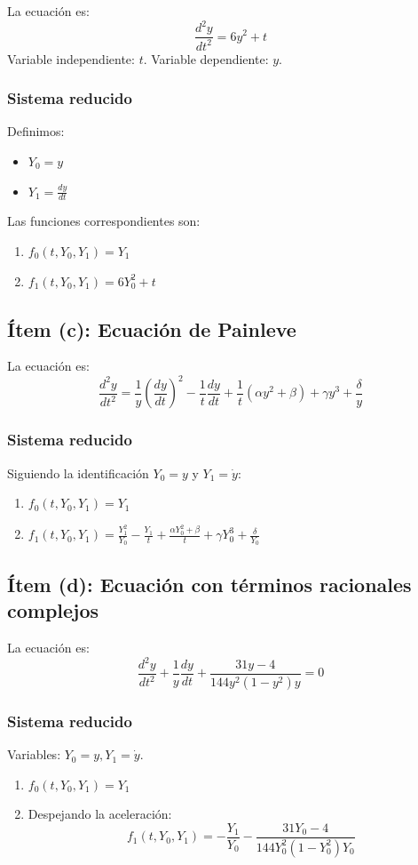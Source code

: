 \documentclass[a4paper]{article}
\begin{document}
La ecuación es: 
$$ \frac{d^2y}{dt^2} = 6y^2 + t $$
Variable independiente: $t$. Variable dependiente: $y$.

\subsubsection{Sistema reducido}
Definimos:
\begin{itemize}
    \item $Y_0 = y$
    \item $Y_1 = \frac{dy}{dt}$
\end{itemize}

Las funciones correspondientes son:
\begin{enumerate}
    \item $f_0(t, Y_0, Y_1) = Y_1$
    \item $f_1(t, Y_0, Y_1) = 6Y_0^2 + t$
\end{enumerate}

\subsection{Ítem (c): Ecuación de Painleve}

La ecuación es:
$$ \frac{d^2y}{dt^2} = \frac{1}{y} \left( \frac{dy}{dt} \right)^2 - \frac{1}{t} \frac{dy}{dt} + \frac{1}{t} (\alpha y^2 + \beta) + \gamma y^3 + \frac{\delta}{y} $$

\subsubsection{Sistema reducido}
Siguiendo la identificación $Y_0 = y$ y $Y_1 = \dot{y}$:
\begin{enumerate}
    \item $f_0(t, Y_0, Y_1) = Y_1$
    \item $f_1(t, Y_0, Y_1) = \frac{Y_1^2}{Y_0} - \frac{Y_1}{t} + \frac{\alpha Y_0^2 + \beta}{t} + \gamma Y_0^3 + \frac{\delta}{Y_0}$
\end{enumerate}

\subsection{Ítem (d): Ecuación con términos racionales complejos}

La ecuación es:
$$ \frac{d^2y}{dt^2} + \frac{1}{y} \frac{dy}{dt} + \frac{31y - 4}{144y^2(1-y^2)y} = 0 $$

\subsubsection{Sistema reducido}
Variables: $Y_0 = y, Y_1 = \dot{y}$.
\begin{enumerate}
    \item $f_0(t, Y_0, Y_1) = Y_1$
    \item Despejando la aceleración:
    $$ f_1(t, Y_0, Y_1) = - \frac{Y_1}{Y_0} - \frac{31Y_0 - 4}{144Y_0^2(1 - Y_0^2)Y_0} $$
\end{enumerate}
\end{document}
